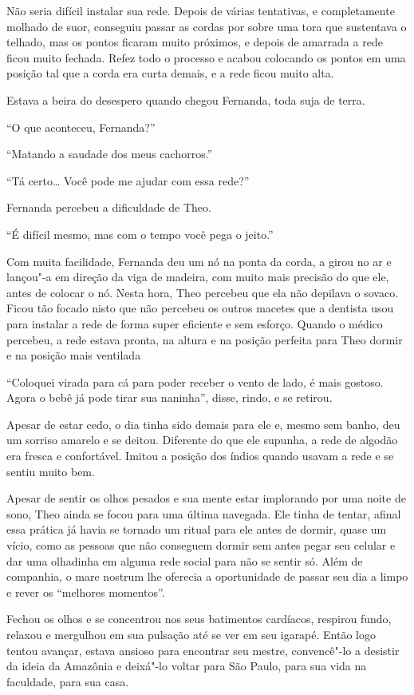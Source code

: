 Não seria difícil instalar sua rede. Depois de várias tentativas, e
completamente molhado de suor, conseguiu passar as cordas por sobre uma
tora que sustentava o telhado, mas os pontos ficaram muito próximos, e
depois de amarrada a rede ficou muito fechada. Refez todo o processo e
acabou colocando os pontos em uma posição tal que a corda era curta
demais, e a rede ficou muito alta.

Estava a beira do desespero quando chegou Fernanda, toda suja de terra.

``O que aconteceu, Fernanda?''

``Matando a saudade dos meus cachorros.''

``Tá certo\ldots{} Você pode me ajudar com essa rede?''

Fernanda percebeu a dificuldade de Theo.

``É difícil mesmo, mas com o tempo você pega o jeito.''

Com muita facilidade, Fernanda deu um nó na ponta da corda, a girou
no ar e lançou"-a em direção da viga de madeira, com muito mais precisão
do que ele, antes de colocar o nó. Nesta hora, Theo percebeu
que ela não depilava o sovaco. Ficou tão focado nisto que não
percebeu os outros macetes que a dentista usou para instalar a rede
de forma super eficiente e sem esforço. Quando o médico percebeu, a rede
estava pronta, na altura e na posição perfeita para Theo dormir e na
posição mais ventilada

``Coloquei virada para cá para poder receber o vento de lado, é mais
gostoso. Agora o bebê já pode tirar sua naninha'', disse, rindo, e se
retirou.

Apesar de estar cedo, o dia tinha sido demais para ele e, mesmo sem
banho, deu um sorriso amarelo e se deitou. Diferente do que ele supunha,
a rede de algodão era fresca e confortável. Imitou a posição dos
índios quando usavam a rede e se sentiu muito bem.

Apesar de sentir os olhos pesados e sua mente estar implorando por uma
noite de sono, Theo ainda se focou para uma última navegada. Ele tinha
de tentar, afinal essa prática já havia se tornado um ritual para ele
antes de dormir, quase um vício, como as pessoas que
não conseguem dormir sem antes pegar seu celular e dar uma olhadinha em
alguma rede social para não se sentir só. Além de companhia, o mare
nostrum lhe oferecia a oportunidade de passar seu dia a limpo e rever os
``melhores momentos''.

Fechou os olhos e se concentrou nos seus batimentos cardíacos, respirou
fundo, relaxou e mergulhou em sua pulsação até se ver em seu igarapé.
Então logo tentou avançar, estava ansioso para encontrar seu mestre,
convencê"-lo a desistir da ideia da Amazônia e deixá"-lo voltar para São
Paulo, para sua vida na faculdade, para sua casa.

